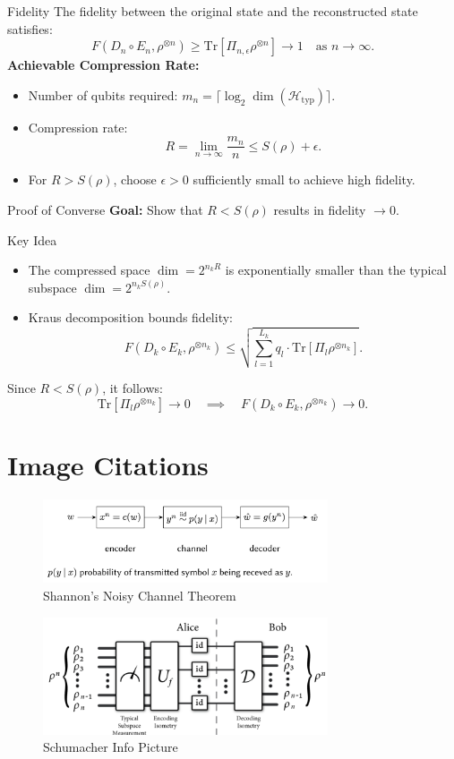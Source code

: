 \begin{frame}{Fidelity}
    The fidelity between the original state and the reconstructed state satisfies:
    \[
    F(D_n \circ E_n, \rho^{\otimes n}) \geq \text{Tr}[\Pi_{n, \epsilon} \rho^{\otimes n}] \to 1 \quad \text{as } n \to \infty.
    \]
    \textbf{Achievable Compression Rate:}
    \begin{itemize}
        \item Number of qubits required: \( m_n = \lceil \log_2 \dim(\mathcal{H}_{\text{typ}}) \rceil \).
        \item Compression rate:
        \[
        R = \lim_{n \to \infty} \frac{m_n}{n} \leq S(\rho) + \epsilon.
        \]
        \item For \( R > S(\rho) \), choose \( \epsilon > 0 \) sufficiently small to achieve high fidelity.
    \end{itemize}
\end{frame}

\begin{frame}{Proof of Converse}
    \textbf{Goal:} Show that \( R < S(\rho) \) results in fidelity \( \to 0 \).
    \begin{block}{Key Idea}
        \begin{itemize}
            \item The compressed space \( \dim = 2^{n_k R} \) is exponentially smaller than the typical subspace \( \dim = 2^{n_k S(\rho)} \).
            \item Kraus decomposition bounds fidelity:
            \[
            F(D_k \circ E_k, \rho^{\otimes n_k}) \leq \sqrt{\sum_{l=1}^{L_k} q_l \cdot \text{Tr}[\Pi_l \rho^{\otimes n_k}]}.
            \]
        \end{itemize}
    \end{block}
    Since \( R < S(\rho) \), it follows:
    \[
    \text{Tr}[\Pi_l \rho^{\otimes n_k}] \to 0 \quad \implies \quad F(D_k \circ E_k, \rho^{\otimes n_k}) \to 0.
    \]
\end{frame}

\section{Image Citations}

\begin{figure}[h]
    \centering
    \includegraphics[width=0.75\textwidth]{figures/shannon_pic.png}
    \caption{Shannon's Noisy Channel Theorem \cite{jahooShannonsNoisy}}
\end{figure}

\begin{figure}[h]
    \centering
    \includegraphics[width=0.75\textwidth]{figures/schumacher.png}
    \caption{Schumacher Info Picture \cite{PhysRevA.51.2738}}
\end{figure}
